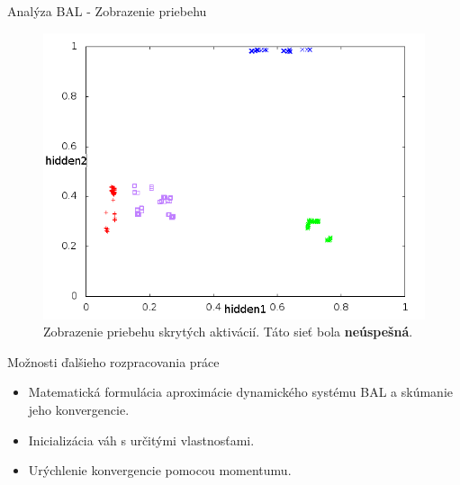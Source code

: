 \documentclass[xcolor=dvipsnames]{beamer}
\begin{document}
\begin{frame}{Analýza BAL - Zobrazenie priebehu}
  \begin{figure}[h!]  
    \centering
    \includegraphics[scale=0.4]{img/non-convergent.png}
    \caption{{\tiny Zobrazenie priebehu skrytých aktivácií. Táto sieť bola {\bf neúspešná}.}} 
  \end{figure} 
\end{frame}



\begin{frame}{Možnosti ďalšieho rozpracovania práce}
  \begin{itemize} 
    \item Matematická formulácia aproximácie dynamického systému BAL a skúmanie jeho konvergencie. 
    \item Inicializácia váh s určitými vlastnosťami.
    \item Urýchlenie konvergencie pomocou momentumu. 
  \end{itemize} 
\end{frame} 
\end{document}
